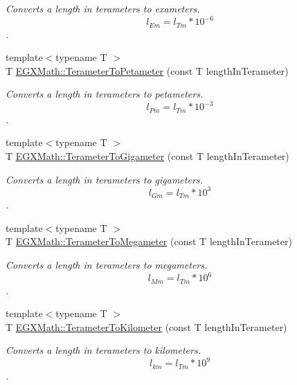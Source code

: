 \begin{DoxyCompactItemize}
\begin{DoxyCompactList}\small\item\em Converts a length in terameters to exameters. \[ l_{Em}=l_{Tm} * 10^{-6} \]. \end{DoxyCompactList}\item 
{\footnotesize template$<$typename T $>$ }\\T \mbox{\hyperlink{group___e_g_x_math-_conversions-_length_conversions-_terameter-_s_i_ga0e5474db8b07f9fd87fa6539a02af527}{E\+G\+X\+Math\+::\+Terameter\+To\+Petameter}} (const T length\+In\+Terameter)
\begin{DoxyCompactList}\small\item\em Converts a length in terameters to petameters. \[ l_{Pm}=l_{Tm} * 10^{-3} \]. \end{DoxyCompactList}\item 
{\footnotesize template$<$typename T $>$ }\\T \mbox{\hyperlink{group___e_g_x_math-_conversions-_length_conversions-_terameter-_s_i_gaf7d05e4ba6ba85ee7c75c65647178cb8}{E\+G\+X\+Math\+::\+Terameter\+To\+Gigameter}} (const T length\+In\+Terameter)
\begin{DoxyCompactList}\small\item\em Converts a length in terameters to gigameters. \[ l_{Gm}=l_{Tm} * 10^{3} \]. \end{DoxyCompactList}\item 
{\footnotesize template$<$typename T $>$ }\\T \mbox{\hyperlink{group___e_g_x_math-_conversions-_length_conversions-_terameter-_s_i_gad4a32011802c13e60cc98081113d52c1}{E\+G\+X\+Math\+::\+Terameter\+To\+Megameter}} (const T length\+In\+Terameter)
\begin{DoxyCompactList}\small\item\em Converts a length in terameters to megameters. \[ l_{Mm}=l_{Tm} * 10^{6} \]. \end{DoxyCompactList}\item 
{\footnotesize template$<$typename T $>$ }\\T \mbox{\hyperlink{group___e_g_x_math-_conversions-_length_conversions-_terameter-_s_i_ga3621654052e072519227ad628e03d68b}{E\+G\+X\+Math\+::\+Terameter\+To\+Kilometer}} (const T length\+In\+Terameter)
\begin{DoxyCompactList}\small\item\em Converts a length in terameters to kilometers. \[ l_{km}=l_{Tm} * 10^{9} \]. \end{DoxyCompactList}\item 

\end{DoxyCompactItemize}
